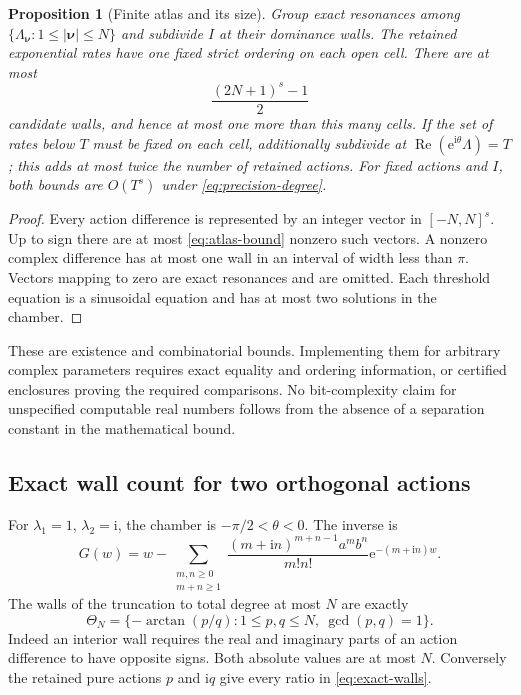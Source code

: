 \documentclass[11pt,a4paper]{article}
\numberwithin{equation}{section}
\newtheorem{proposition}[theorem]{Proposition}
\theoremstyle{definition}
\theoremstyle{remark}
\newcommand{\ii}{\mathrm i}
\newcommand{\e}{\mathrm e}
\newcommand{\Rea}{\operatorname{Re}}
\newcommand{\nn}{\boldsymbol\nu}
\begin{document}
\begin{proposition}[Finite atlas and its size]\label{prop:finite-atlas}
Group exact resonances among $\{\Lambda_{\nn}:1\le|\nn|\le N\}$ and
subdivide $I$ at their dominance walls. The retained exponential rates
have one fixed strict ordering on each open cell. There are at most
\begin{equation}\label{eq:atlas-bound}
 \frac{(2N+1)^s-1}{2}
\end{equation}
candidate walls, and hence at most one more than this many cells.
If the set of rates below $T$ must be fixed on each cell, additionally
subdivide at $\Rea(\e^{\ii\theta}\Lambda)=T$; this adds at most twice
the number of retained actions. For fixed actions and $I$, both bounds
are $O(T^s)$ under \eqref{eq:precision-degree}.
\end{proposition}

\begin{proof}
Every action difference is represented by an integer vector in
$[-N,N]^s$. Up to sign there are at most \eqref{eq:atlas-bound}
nonzero such vectors. A nonzero complex difference has at most one
wall in an interval of width less than $\pi$. Vectors mapping to zero
are exact resonances and are omitted. Each threshold equation is a
sinusoidal equation and has at most two solutions in the chamber.
\end{proof}

These are existence and combinatorial bounds. Implementing them for
arbitrary complex parameters requires exact equality and ordering
information, or certified enclosures proving the required comparisons.
No bit-complexity claim for unspecified computable real numbers follows
from the absence of a separation constant in the mathematical bound.

\subsection{Exact wall count for two orthogonal actions}

For $\lambda_1=1$, $\lambda_2=\ii$, the chamber is
$-\pi/2<\theta<0$. The inverse is
\begin{equation}\label{eq:orthogonal-inverse}
 G(w)=w-
 \sum_{\substack{m,n\ge0\\m+n\ge1}}
 \frac{(m+\ii n)^{m+n-1}a^m b^n}{m!n!}\e^{-(m+\ii n)w}.
\end{equation}
The walls of the truncation to total degree at most $N$ are exactly
\begin{equation}\label{eq:exact-walls}
 \Theta_N=\{-\arctan(p/q):1\le p,q\le N,\ \gcd(p,q)=1\}.
\end{equation}
Indeed an interior wall requires the real and imaginary parts of an
action difference to have opposite signs. Both absolute values are
at most $N$. Conversely the retained pure actions $p$ and $\ii q$
give every ratio in \eqref{eq:exact-walls}.
\end{document}
